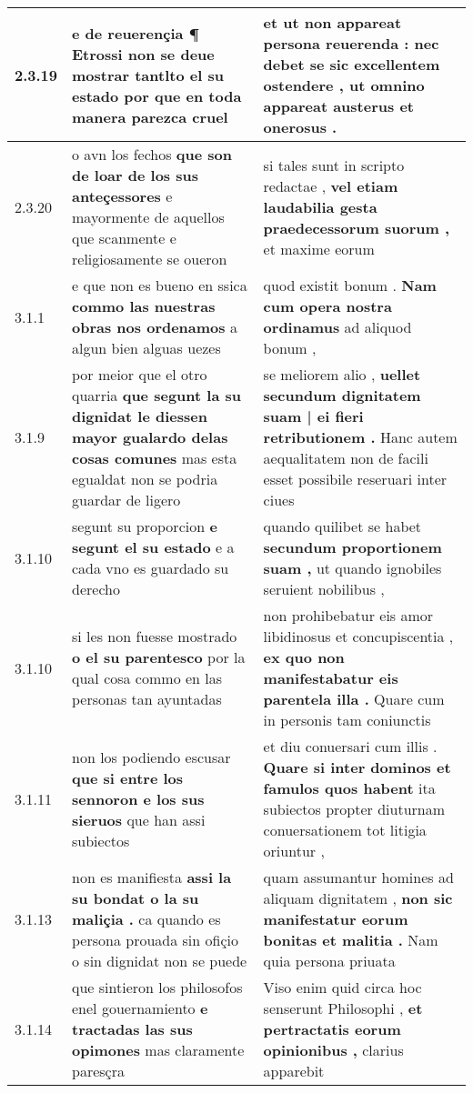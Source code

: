 \begin{tabular}{|p{1cm}|p{6.5cm}|p{6.5cm}|}
2.3.19 & e de reuerençia \textbf{ ¶ Etrossi non se deue mostrar tantlto el su estado } por que en toda manera parezca cruel & et ut non appareat persona reuerenda : \textbf{ nec debet se sic excellentem ostendere , } ut omnino appareat austerus et onerosus . \\\hline
2.3.20 & o avn los fechos \textbf{ que son de loar de los sus anteçessores } e mayormente de aquellos que scanmente e religiosamente se oueron & si tales sunt in scripto redactae , \textbf{ vel etiam laudabilia gesta praedecessorum suorum , } et maxime eorum \\\hline
3.1.1 & e que non es bueno en ssica \textbf{ commo las nuestras obras nos ordenamos } a algun bien alguas uezes & quod existit bonum . \textbf{ Nam cum opera nostra ordinamus } ad aliquod bonum , \\\hline
3.1.9 & por meior que el otro quarria \textbf{ que segunt la su dignỉdat le diessen mayor gualardo delas cosas comunes } mas esta egualdat non se podria guardar de ligero & se meliorem alio , \textbf{ uellet secundum dignitatem suam | ei fieri retributionem . } Hanc autem aequalitatem non de facili esset possibile reseruari inter ciues \\\hline
3.1.10 & segunt su proporcion \textbf{ e segunt el su estado } e a cada vno es guardado su derecho & quando quilibet se habet \textbf{ secundum proportionem suam , } ut quando ignobiles seruient nobilibus , \\\hline
3.1.10 & si les non fuesse mostrado \textbf{ o el su parentesco } por la qual cosa commo en las personas tan ayuntadas & non prohibebatur eis amor libidinosus et concupiscentia , \textbf{ ex quo non manifestabatur eis parentela illa . } Quare cum in personis tam coniunctis \\\hline
3.1.11 & non los podiendo escusar \textbf{ que si entre los sennoron e los sus sieruos } que han assi subiectos & et diu conuersari cum illis . \textbf{ Quare si inter dominos et famulos quos habent } ita subiectos propter diuturnam conuersationem tot litigia oriuntur , \\\hline
3.1.13 & non es manifiesta \textbf{ assi la su bondat o la su maliçia . } ca quando es persona prouada sin ofiçio o sin dignidat non se puede & quam assumantur homines ad aliquam dignitatem , \textbf{ non sic manifestatur eorum bonitas et malitia . } Nam quia persona priuata \\\hline
3.1.14 & que sintieron los philosofos enel gouernamiento \textbf{ e tractadas las sus opimones } mas claramente paresçra & Viso enim quid circa hoc senserunt Philosophi , \textbf{ et pertractatis eorum opinionibus , } clarius apparebit \\\hline

\end{tabular}
